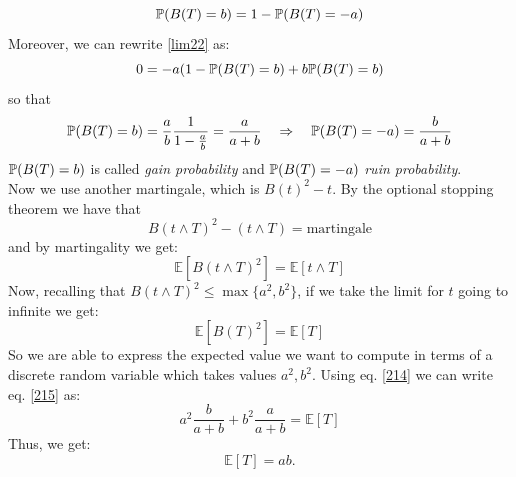 \begin{example}{}{}{}
\begin{equation}
        \mathbb{P}(B(T)=b) = 1 - \mathbb{P}(B(T)=-a)
    \end{equation}
    Moreover, we can rewrite \eqref{lim22} as:
    \begin{equation}
        0 = -a(1-\mathbb{P}(B(T)=b) + b\mathbb{P}(B(T)=b)
    \end{equation}
    so that
    \begin{equation}\label{214}
        \mathbb{P}(B(T)=b) = \frac{a}{b}\frac{1}{1-\frac{a}{b}} = \frac{a}{a+b} \quad\Rightarrow\quad \mathbb{P}(B(T)=-a) = \frac{b}{a+b}
    \end{equation}
    $\mathbb{P}(B(T)=b)$ is called \emph{gain probability} and $\mathbb{P}(B(T)=-a)$ \emph{ruin probability}. \\
    Now we use another martingale, which is $B(t)^2 - t$. By the optional stopping theorem we have that
    \begin{equation}
        B(t\wedge T)^2 - (t\wedge T) = \text{martingale}
    \end{equation}
    and by martingality we get:
    \begin{equation}
        \mathbb{E}[B(t\wedge T)^2] = \mathbb{E}[t\wedge T]
    \end{equation}
    Now, recalling that $B(t\wedge T)^2 \le \max\{a^2,b^2\}$, if we take the limit for $t$ going to infinite we get:
    \begin{equation}\label{215}
        \mathbb{E}[B(T)^2] = \mathbb{E}[T]
    \end{equation}
    So we are able to express the expected value we want to compute in terms of a discrete random variable which takes values $a^2,b^2$. Using eq. \eqref{214} we can write eq. \eqref{215} as:
    \begin{equation}
        a^2\frac{b}{a+b} + b^2\frac{a}{a+b} = \mathbb{E}[T]
    \end{equation}
    Thus, we get:
    \begin{equation}
        \mathbb{E}[T] = ab.
    \end{equation}
\end{example}

